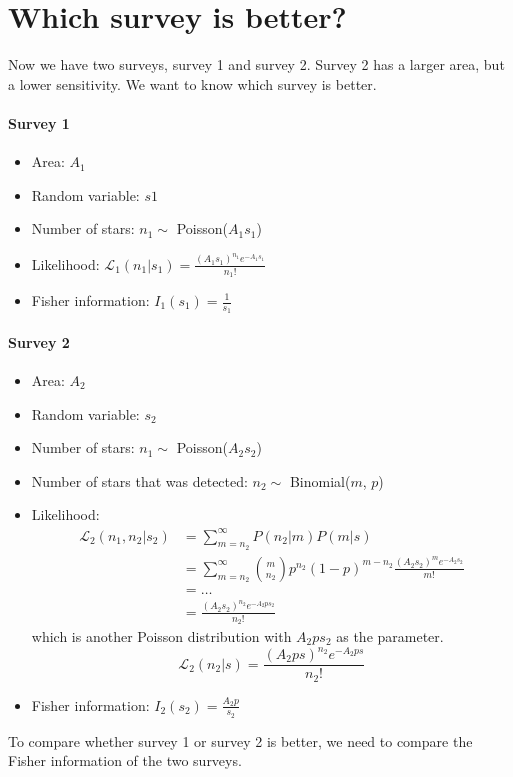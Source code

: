 \documentclass[12pt,a4paper]{article}
\begin{document}
\section{Which survey is better?}
Now we have two surveys, survey 1 and survey 2. Survey 2 has a larger area, but a lower sensitivity. We want to know which survey is better.\\
\paragraph{Survey 1}
\begin{itemize}
    \item Area: $A_1$
    \item Random variable: $s1$
    \item Number of stars: $n_1 \sim$ Poisson($A_1s_1$)
    \item Likelihood: $\mathcal{L}_1(n_1|s_1) = \frac{(A_1s_1)^{n_1} e^{-A_1s_1}}{n_1!}$
    \item Fisher information: $I_1(s_1) = \frac{1}{s_1}$
\end{itemize}

\paragraph{Survey 2}
\begin{itemize}
    \item Area: $A_2$
    \item Random variable: $s_2$
    \item Number of stars: $n_1 \sim$ Poisson($A_2s_2$)
    \item Number of stars that was detected: $n_2 \sim$ Binomial($m$, $p$)
    \item Likelihood: 
    \begin{align*}
        \mathcal{L}_2(n_1, n_2|s_2) &= \sum^{\infty}_{m=n_2}P(n_2|m)P(m|s)\\
        &= \sum^{\infty}_{m=n_2}\binom{m}{n_2}p^{n_2}(1-p)^{m-n_2}\frac{(A_2s_2)^m e^{-A_2s_2}}{m!}\\
        &= \dots\\
        &= \frac{(A_2s_2)^{n_2} e^{-A_2ps_2}}{n_2!}
    \end{align*}
    which is another Poisson distribution with $A_2ps_2$ as the parameter.
    $$
        \mathcal{L}_2(n_2|s) = \frac{(A_2ps)^{n_2} e^{-A_2ps}}{n_2!}
    $$
    \item Fisher information: $I_2(s_2) = \frac{A_2p}{s_2}$
\end{itemize}
To compare whether survey 1 or survey 2 is better, we need to compare the Fisher information of the two surveys.\\
\end{document}

